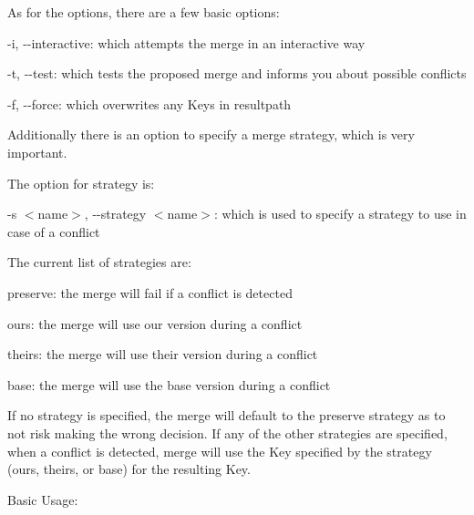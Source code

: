 As for the options, there are a few basic options\+:


\begin{DoxyItemize}
\item {\ttfamily -\/i}, {\ttfamily -\/-\/interactive}\+: which attempts the merge in an interactive way
\item {\ttfamily -\/t}, {\ttfamily -\/-\/test}\+: which tests the proposed merge and informs you about possible conflicts
\item {\ttfamily -\/f}, {\ttfamily -\/-\/force}\+: which overwrites any Keys in {\ttfamily resultpath}
\end{DoxyItemize}

Additionally there is an option to specify a merge strategy, which is very important.

The option for strategy is\+:


\begin{DoxyItemize}
\item {\ttfamily -\/s $<$name$>$}, {\ttfamily -\/-\/strategy $<$name$>$}\+: which is used to specify a strategy to use in case of a conflict
\end{DoxyItemize}

The current list of strategies are\+:


\begin{DoxyItemize}
\item {\ttfamily preserve}\+: the merge will fail if a conflict is detected
\item {\ttfamily ours}\+: the merge will use our version during a conflict
\item {\ttfamily theirs}\+: the merge will use their version during a conflict
\item {\ttfamily base}\+: the merge will use the base version during a conflict
\end{DoxyItemize}

If no strategy is specified, the merge will default to the preserve strategy as to not risk making the wrong decision. If any of the other strategies are specified, when a conflict is detected, merge will use the Key specified by the strategy ({\ttfamily ours}, {\ttfamily theirs}, or {\ttfamily base}) for the resulting Key.

Basic Usage\+:


\begin{DoxyCode}{0}
\end{DoxyCode}


